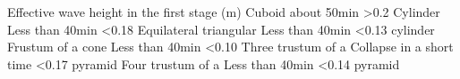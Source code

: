 

Effective wave height in
the first stage (m)
Cuboid
about 50min
>0.2
Cylinder
Less than 40min
<0.18
Equilateral triangular
Less than 40min
<0.13
cylinder
Frustum of a cone
Less than 40min
<0.10
Three trustum of a
Collapse in a short time
<0.17
pyramid
Four trustum of a
Less than 40min
<0.14
pyramid